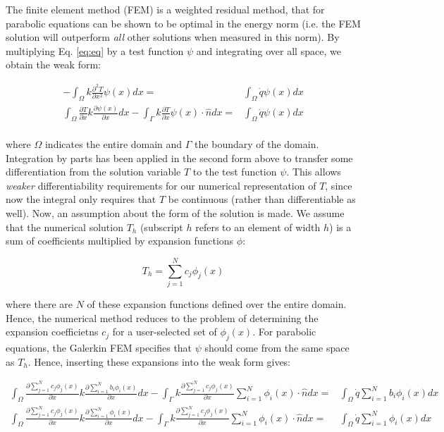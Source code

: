 \documentclass[10pt]{article}
\newcommand{\beq}{\begin{equation}}
\newcommand{\eeq}{\end{equation}}
\newcommand{\beqa}{\begin{equation}\begin{aligned}}
\newcommand{\eeqa}{\end{aligned}\end{equation}}
\begin{document}
The finite element method (FEM) is a weighted residual method, that for parabolic equations can be shown to be optimal in the energy norm (i.e. the FEM solution will outperform {\it all} other solutions when measured in this norm). By multiplying Eq. \eqref{eq:eq} by a test function \(\psi\) and integrating over all space, we obtain the weak form:

\beqa
-\int_{\Omega}k\frac{\partial^2 T}{\partial x^2}\psi(x)dx=&\int_{\Omega}\dot{q}\psi(x)dx\\
\int_{\Omega}\frac{\partial T}{\partial x}k\frac{\partial\psi(x)}{\partial x}dx-\int_{\Gamma}k\frac{\partial T}{\partial x}\psi(x)\cdot\hat{n}dx=&\int_{\Omega}\dot{q}\psi(x)dx\\
\eeqa

where \(\Omega\) indicates the entire domain and \(\Gamma\) the boundary of the domain. Integration by parts has been applied in the second form above to transfer some differentiation from the solution variable \(T\) to the test function \(\psi\). This allows {\it weaker} differentiability requirements for our numerical representation of \(T\), since now the integral only requires that \(T\) be continuous (rather than differentiable as well). Now, an assumption about the form of the solution is made. We assume that the numerical solution \(T_h\) (subscript \(h\) refers to an element of width \(h\)) is a sum of coefficients multiplied by expansion functions \(\phi\):

\beq
T_h=\sum_{j=1}^{N}c_j\phi_j(x)
\eeq

where there are \(N\) of these expansion functions defined over the entire domain. Hence, the numerical method reduces to the problem of determining the expansion coefficietns \(c_j\) for a user-selected set of \(\phi_j(x)\). For parabolic equations, the Galerkin FEM specifies that \(\psi\) should come from the same space as \(T_h\). Hence, inserting these expansions into the weak form gives:

\beqa
\int_{\Omega}\frac{\partial \sum_{j=1}^Nc_j\phi_j(x)}{\partial x}k\frac{\partial\sum_{i=1}^Nb_i\phi_i(x)}{\partial x}dx-\int_{\Gamma}k\frac{\partial \sum_{j=1}^Nc_j\phi_j(x)}{\partial x}\sum_{i=1}^N\phi_i(x)\cdot\hat{n}dx=&\int_{\Omega}\dot{q}\sum_{i=1}^Nb_i\phi_i(x)dx\\
\int_{\Omega}\frac{\partial \sum_{j=1}^Nc_j\phi_j(x)}{\partial x}k\frac{\partial\sum_{i=1}^N\phi_i(x)}{\partial x}dx-\int_{\Gamma}k\frac{\partial \sum_{j=1}^Nc_j\phi_j(x)}{\partial x}\sum_{i=1}^N\phi_i(x)\cdot\hat{n}dx=&\int_{\Omega}\dot{q}\sum_{i=1}^N\phi_i(x)dx\\
\eeqa
\end{document}
